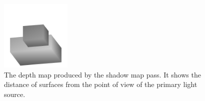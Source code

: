 \documentclass[format=sigconf]{acmart}
\begin{document}
\begin{figure}[H]
  \begin{center}
    \includegraphics[width=0.3\textwidth]{pipeline-shadow.png}
  \end{center}
  \caption{The depth map produced by the shadow map pass. It shows the distance of surfaces from the point of view of the primary light source.}
  \label{fig:pipeline-shadow}
\end{figure}
\end{document}
